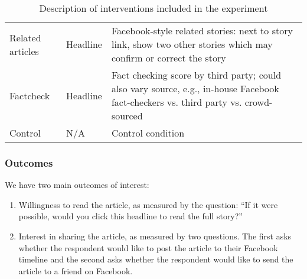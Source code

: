 \documentclass[letterpaper, 12pt, parskip=full, headsepline]{scrartcl}
\begin{document}
\begin{table}[htb]
\begin{tabular}{l|l|l}
Related articles                                                                                                       & Headline                                                                                                     & Facebook-style related stories: next to story link, show two other stories which may confirm or correct the story                                                                                                                                                                                                                                                                                               \\
Factcheck                                                                                                      & Headline                                                                                                     & Fact checking score by third party; could also vary source, e.g., in-house Facebook fact-checkers vs. third party vs. crowd-sourced                                                                                                                                                                                                                                                                             \\
Control                                                                                                        & N/A                                                                                                          & Control condition                                                                                                                                                                                                                                                                                                                                                                                              
\end{tabular}
\caption{Description of interventions included in the experiment}
\end{table}



\subsubsection{Outcomes}
We have two main outcomes of interest:

\begin{enumerate}
\item Willingness to read the article, as measured by the question: ``If it were possible, would you click this headline to read the full story?''
\item Interest in sharing the article, as measured by two questions. The first asks whether the respondent would like to post the article to their Facebook timeline and the second asks whether the respondent would like to send the article to a friend on Facebook. 
\end{enumerate}
\end{document}
